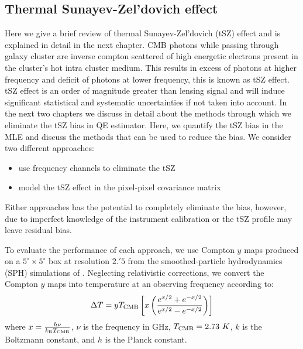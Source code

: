  \subsection{Thermal Sunayev-Zel'dovich effect}
 \label{tSZ_effect_bias}
Here we give a brief review of thermal Sunayev-Zel'dovich (tSZ) effect and is explained in detail in the next chapter.
CMB photons while passing through galaxy cluster are inverse compton scattered of high energetic electrons present in the cluster's hot intra cluster medium.
This results in excess of photons at higher frequency and deficit of photons at lower frequency, this is known as tSZ effect.
tSZ effect is an order of magnitude greater than lensing signal and will induce significant statistical and systematic uncertainties if not taken into account.
In the next two chapters we discuss in detail about the methods through which we eliminate the tSZ bias in QE estimator.
Here, we quantify the tSZ bias in the MLE and discuss the methods that can be used to reduce the bias.
We consider two different approaches:
\begin{itemize}
\item use frequency channels to eliminate the tSZ
\item model the tSZ effect in the pixel-pixel covariance matrix
\end{itemize}
Either approaches has the potential to completely eliminate the bias, however, due to imperfect knowledge of the instrument calibration or the tSZ profile may leave residual bias. 


To evaluate the performance of each approach,  we use Compton $y$ maps produced on a $5^{\circ} \times 5^{\circ}$ box at resolution $2.'5$ from the smoothed-particle hydrodynamics (SPH) simulations of  \citet{mccarthy13}.
Neglecting relativistic corrections, we convert the Compton $y$ maps into temperature at an observing frequency according to:
\begin{eqnarray}
\Delta T = y T_{\rm CMB} \left[x \left(\frac{e^{x/2} + e^{-x/2}}{e^{x/2} - e^{-x/2}}  \right)\right]
\end{eqnarray} where $x = \frac{h\nu}{k_{\rm B}T_{\rm CMB}}$, $\nu$ is the frequency in GHz, $T_{\rm CMB} = 2.73\ K$, $k$ is the Boltzmann constant, and $h$ is the Planck constant.

